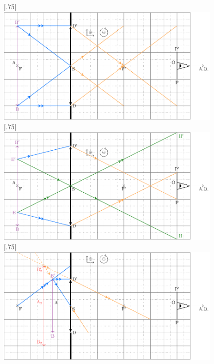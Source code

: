 \documentclass[a4paper, 10pt, garamond, oneside]{book}
\begin{document}
{	\begin{figure}[htbp!]
		\centering
		[.75\linewidth]
		{\includegraphics[width=\linewidth]{P1_1-corr}}
		[.75\linewidth]
		{\includegraphics[width=\linewidth]{P1_2-corr}}
		[.75\linewidth]
		{\includegraphics[width=\linewidth]{P1_3-corr}}
		\caption{}
		\label{fig:gob}
	\end{figure}
}
\vspace{-20pt}
\end{document}
